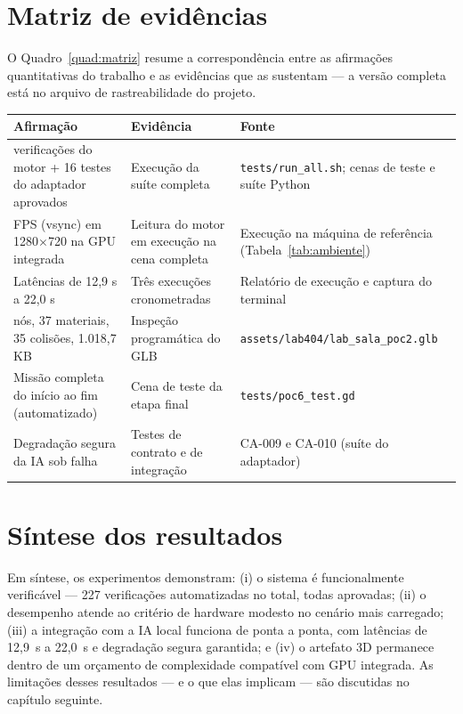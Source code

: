 \section{Matriz de evidências}
\label{sec:res_matriz}

O Quadro~\ref{quad:matriz} resume a correspondência entre as afirmações
quantitativas do trabalho e as evidências que as sustentam --- a versão
completa está no arquivo de rastreabilidade do projeto.

\begin{quadro}[htbp]
\centering
\caption{Correspondência entre afirmações quantitativas e evidências.}
\label{quad:matriz}
\footnotesize
\begin{tabular}{@{}>{\raggedright\arraybackslash}p{4.6cm} >{\raggedright\arraybackslash}p{4.4cm} >{\raggedright\arraybackslash}p{3.8cm}@{}}
\toprule
Afirmação & Evidência & Fonte \\
\midrule
211 verificações do motor + 16 testes do adaptador aprovados & Execução da suíte completa & \texttt{tests/run\_all.sh}; cenas de teste e suíte Python \\
60 FPS (vsync) em 1280$\times$720 na GPU integrada & Leitura do motor em execução na cena completa & Execução na máquina de referência (Tabela~\ref{tab:ambiente}) \\
Latências de 12,9 s a 22,0 s & Três execuções cronometradas & Relatório de execução e captura do terminal \\
342 nós, 37 materiais, 35 colisões, 1.018,7 KB & Inspeção programática do GLB & \texttt{assets/lab404/}\allowbreak\texttt{lab\_sala\_poc2.glb} \\
Missão completa do início ao fim (automatizado) & Cena de teste da etapa final & \texttt{tests/poc6\_test.gd} \\
Degradação segura da IA sob falha & Testes de contrato e de integração & CA-009 e CA-010 (suíte do adaptador) \\
\bottomrule
\end{tabular}
\par\vspace{2pt}{\footnotesize Fonte: elaborado pelo autor (2026).}
\end{quadro}

\section{Síntese dos resultados}
\label{sec:res_sintese}

Em síntese, os experimentos demonstram: (i) o sistema é funcionalmente
verificável --- 227 verificações automatizadas no total, todas aprovadas;
(ii) o desempenho atende ao critério de hardware modesto no cenário mais
carregado; (iii) a integração com a IA local funciona de ponta a ponta, com
latências de 12,9~s a 22,0~s e degradação segura garantida; e (iv) o
artefato 3D permanece dentro de um orçamento de complexidade compatível com
GPU integrada. As limitações desses resultados --- e o que elas implicam ---
são discutidas no capítulo seguinte.
